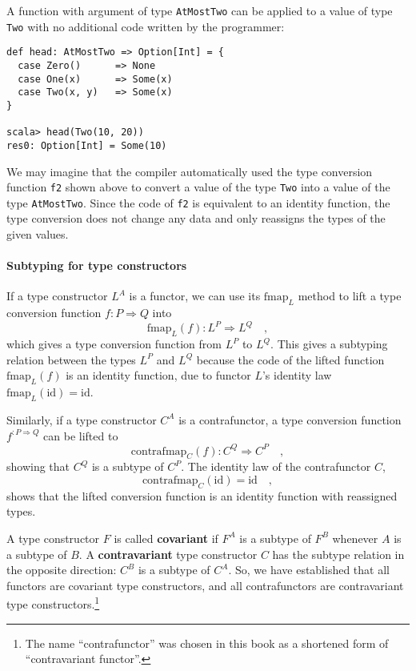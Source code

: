 A function with argument of type \lstinline!AtMostTwo! can be applied
to a value of type \lstinline!Two! with no additional code written
by the programmer:
\begin{lstlisting}
def head: AtMostTwo => Option[Int] = {
  case Zero()      => None
  case One(x)      => Some(x)
  case Two(x, y)   => Some(x)
}

scala> head(Two(10, 20))
res0: Option[Int] = Some(10)
\end{lstlisting}
We may imagine that the compiler automatically used the type conversion
function \lstinline!f2! shown above to convert a value of the type
\lstinline!Two! into a value of the type \lstinline!AtMostTwo!.
Since the code of \lstinline!f2! is equivalent to an identity function,
the type conversion does not change any data and only reassigns the
types of the given values.

\paragraph{Subtyping for type constructors}

If a type constructor $L^{A}$ is a functor, we can use its $\text{fmap}_{L}$
method to lift a type conversion function $f:P\Rightarrow Q$ into
\[
\text{fmap}_{L}(f):L^{P}\Rightarrow L^{Q}\quad,
\]
which gives a type conversion function from $L^{P}$ to $L^{Q}$.
This gives a subtyping relation between the types $L^{P}$ and $L^{Q}$
because the code of the lifted function $\text{fmap}_{L}(f)$ is an
identity function, due to functor $L$'s identity law $\text{fmap}_{L}(\text{id})=\text{id}$. 

Similarly, if a type constructor $C^{A}$ is a contrafunctor, a type
conversion function $f^{:P\Rightarrow Q}$ can be lifted to 
\[
\text{contrafmap}_{C}(f):C^{Q}\Rightarrow C^{P}\quad,
\]
showing that $C^{Q}$ is a subtype of $C^{P}$. The identity law of
the contrafunctor $C$, 
\[
\text{contrafmap}_{C}(\text{id})=\text{id}\quad,
\]
shows that the lifted conversion function is an identity function
with reassigned types.

A type constructor $F$ is called \textbf{covariant}
if $F^{A}$ is a subtype of $F^{B}$ whenever $A$ is a subtype of
$B$. A \textbf{contravariant}
type constructor $C$ has the subtype relation in the opposite direction:
$C^{B}$ is a subtype of $C^{A}$. So, we have established that all
functors are covariant type constructors, and all contrafunctors are
contravariant type constructors.\footnote{The name ``contrafunctor'' was chosen in this book as a shortened
form of ``contravariant functor''.} 

